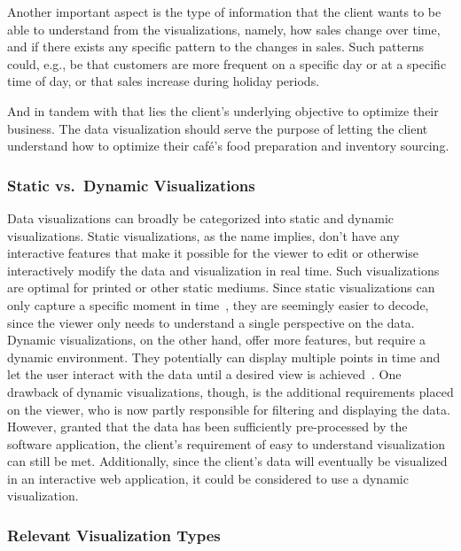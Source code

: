 Another important aspect is the type of information that the client wants to be able to understand from the
visualizations, namely, how sales change over time, and if there exists any specific pattern to the changes in sales.
Such patterns could, e.g., be that customers are more frequent on a specific day or at a specific time of day, or that
sales increase during holiday periods.

And in tandem with that lies the client's underlying objective to optimize their business.
The data visualization should serve the purpose of letting the client understand how to optimize their café's food
preparation and inventory sourcing.

\subsubsection{Static vs.\ Dynamic Visualizations}\label{subsubsec:static-vs-dynamic-visualizations}

Data visualizations can broadly be categorized into static and dynamic visualizations.
Static visualizations, as the name implies, don't have any interactive features that make it possible for the viewer to
edit or otherwise interactively modify the data and visualization in real time.
Such visualizations are optimal for printed or other static mediums.
Since static visualizations can only capture a specific moment in time~\cite{wpDataTablesDynamicVisualization}, they are
seemingly easier to decode, since the viewer only needs to understand a single perspective on the data.
Dynamic visualizations, on the other hand, offer more features, but require a dynamic environment.
They potentially can display multiple points in time and let the user interact with the data until a desired view is
achieved~\cite{wpDataTablesDynamicVisualization}.
One drawback of dynamic visualizations, though, is the additional requirements placed on the viewer, who is now partly
responsible for filtering and displaying the data.
However, granted that the data has been sufficiently pre-processed by the software application, the client's requirement of
easy to understand visualization can still be met.
Additionally, since the client's data will eventually be visualized in an interactive web application, it could be
considered to use a dynamic visualization.

\subsubsection{Relevant Visualization Types}\label{subsubsec:relevant-visualization-types}

